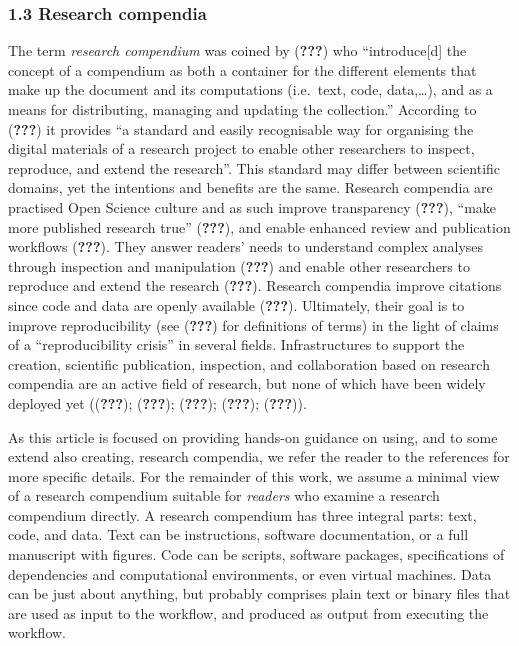 \documentclass[twocolumn]{article}
\begin{document}
\hypertarget{research-compendia}{%
\subsubsection*{1.3 Research compendia}\label{research-compendia}}

The term \emph{research compendium} was coined by ({\textbf{???}}) who
``introduce{[}d{]} the concept of a compendium as both a container for
the different elements that make up the document and its computations
(i.e.~text, code, data,\ldots{}), and as a means for distributing,
managing and updating the collection.'' According to ({\textbf{???}}) it
provides ``a standard and easily recognisable way for organising the
digital materials of a research project to enable other researchers to
inspect, reproduce, and extend the research''. This standard may differ
between scientific domains, yet the intentions and benefits are the
same. Research compendia are practised Open Science culture and as such
improve transparency ({\textbf{???}}), ``make more published research
true'' ({\textbf{???}}), and enable enhanced review and publication
workflows ({\textbf{???}}). They answer readers' needs to understand
complex analyses through inspection and manipulation ({\textbf{???}})
and enable other researchers to reproduce and extend the research
({\textbf{???}}). Research compendia improve citations since code and
data are openly available ({\textbf{???}}). Ultimately, their goal is to
improve reproducibility (see ({\textbf{???}}) for definitions of terms)
in the light of claims of a ``reproducibility crisis'' in several
fields. Infrastructures to support the creation, scientific publication,
inspection, and collaboration based on research compendia are an active
field of research, but none of which have been widely deployed yet
(({\textbf{???}}); ({\textbf{???}}); ({\textbf{???}}); ({\textbf{???}});
({\textbf{???}})).

As this article is focused on providing hands-on guidance on using, and
to some extend also creating, research compendia, we refer the reader to
the references for more specific details. For the remainder of this
work, we assume a minimal view of a research compendium suitable for
\emph{readers} who examine a research compendium directly. A research
compendium has three integral parts: text, code, and data. Text can be
instructions, software documentation, or a full manuscript with figures.
Code can be scripts, software packages, specifications of dependencies
and computational environments, or even virtual machines. Data can be
just about anything, but probably comprises plain text or binary files
that are used as input to the workflow, and produced as output from
executing the workflow.
\end{document}
